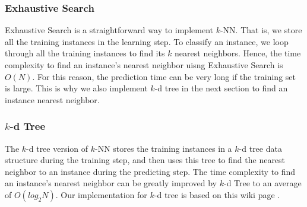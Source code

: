 \subsubsection{Exhaustive Search}
Exhaustive Search is a straightforward way to implement $k$-NN. That is, we store all the training instances in the learning step. To classify an instance, we loop through all the training instances to find its $k$ nearest neighbors. Hence, the time complexity to find an instance's nearest neighbor uisng Exhaustive Search is $O(N)$. For this reason, the prediction time can be very long if the training set is large. This is why we also implement $k$-d tree in the next section to find an instance nearest neighbor.

\subsubsection{$k$-d Tree}
The $k$-d tree version of $k$-NN stores the training instances in a $k$-d tree data structure during the training step, and then uses this tree to find the nearest neighbor to an instance during the predicting step. The time complexity to find an instance's nearest neighbor can be greatly improved by $k$-d Tree to an average of $O(log_2N)$. Our implementation for $k$-d tree is based on this wiki page \cite{KDWiki}.
